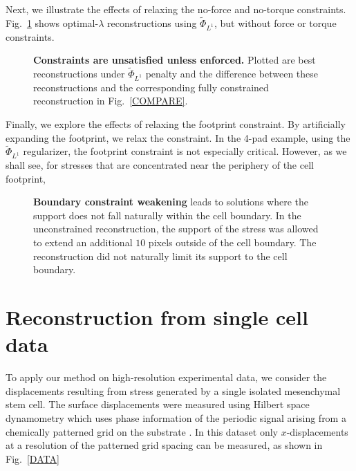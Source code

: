 \documentclass[aps,prl,reprint,twocolumn,groupedaddress,showpacs]{revtex4}
\begin{document}
Next, we illustrate the effects of relaxing the no-force and no-torque
constraints.  Fig.~\ref{fig:fig3} shows optimal-$\lambda$
reconstructions using $\tilde{\Phi}_{L^{1}}$, but without force or
torque constraints.

\begin{figure}
\caption{\textbf{Constraints are unsatisfied unless enforced.} Plotted are best reconstructions
  under $\tilde{\Phi}_{L^{1}}$ penalty and the difference between
  these reconstructions and the corresponding fully constrained
  reconstruction in Fig.~\ref{COMPARE}. }
\label{fig:fig3}
\end{figure}

Finally, we explore the effects of relaxing the footprint constraint. 
By artificially expanding the footprint, we relax the 
constraint. In the 4-pad example, using the $\tilde{\Phi}_{L^{1}}$
regularizer, the footprint constraint is not 
especially critical. However, as we shall see, for stresses that are concentrated 
near the periphery of the cell footprint, 

\begin{figure}
\caption{\textbf{Boundary constraint weakening} leads to solutions
  where the support does not fall naturally within the cell
  boundary. In the unconstrained reconstruction, the support of the
  stress was allowed to extend an additional $10$ pixels outside of
  the cell boundary. The reconstruction did not naturally limit its
  support to the cell boundary.}
\label{fig:fig4}
\end{figure}


\section{Reconstruction from single cell data}

To apply our method on high-resolution experimental data, we consider
the displacements resulting from stress generated by a single isolated
mesenchymal stem cell. The surface displacements were measured using
Hilbert space dynamometry which uses phase information of the periodic
signal arising from a chemically patterned grid on the substrate
\cite{POPESCU}.  In this dataset only $x$-displacements at a
resolution of the patterned grid spacing can be measured, as shown in
Fig.~\ref{DATA}
\end{document}
